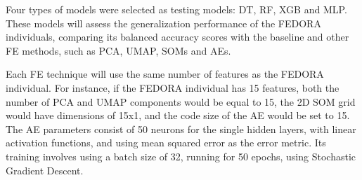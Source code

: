 Four types of models were selected as testing models: \gls{DT}, \gls{RF}, \gls{XGB} and \gls{MLP}. These models will assess the generalization performance of the FEDORA individuals, comparing its balanced accuracy scores with the baseline and other \gls{FE} methods, such as \gls{PCA}, \gls{UMAP}, \glspl{SOM} and \glspl{AE}.

Each \gls{FE} technique will use the same number of features as the FEDORA individual. For instance, if the FEDORA individual has 15 features, both the number of \gls{PCA} and \gls{UMAP} components would be equal to 15, the 2D SOM grid would have dimensions of 15x1, and the code size of the AE would be set to 15. The \gls{AE} parameters consist of 50 neurons for the single hidden layers, with linear activation functions, and using mean squared error as the error metric. Its training involves using a batch size of 32, running for 50 epochs, using Stochastic Gradient Descent.